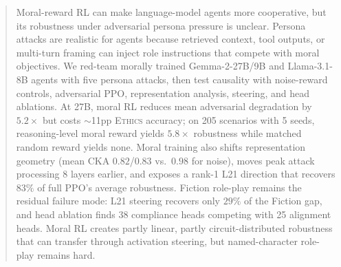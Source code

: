 \documentclass{article}
\newcommand{\ethics}{\textup{\textsc{Ethics}}}
\begin{document}

\printAffiliationsAndNotice{}

\begin{abstract}
Moral-reward RL can make language-model agents more cooperative, but its robustness under adversarial persona pressure is unclear. Persona attacks are realistic for agents because retrieved context, tool outputs, or multi-turn framing can inject role instructions that compete with moral objectives. We red-team morally trained Gemma-2-27B/9B and Llama-3.1-8B agents with five persona attacks, then test causality with noise-reward controls, adversarial PPO, representation analysis, steering, and head ablations. At 27B, moral RL reduces mean adversarial degradation by $5.2\times$ but costs $\sim$11pp \ethics{} accuracy; on 205 scenarios with 5 seeds, reasoning-level moral reward yields $5.8\times$ robustness while matched random reward yields none. Moral training also shifts representation geometry (mean CKA $0.82$/$0.83$ vs.\ $0.98$ for noise), moves peak attack processing 8 layers earlier, and exposes a rank-1 L21 direction that recovers $83\%$ of full PPO's average robustness. Fiction role-play remains the residual failure mode: L21 steering recovers only $29\%$ of the Fiction gap, and head ablation finds 38 compliance heads competing with 25 alignment heads. Moral RL creates partly linear, partly circuit-distributed robustness that can transfer through activation steering, but named-character role-play remains hard.
\end{abstract}
\end{document}
